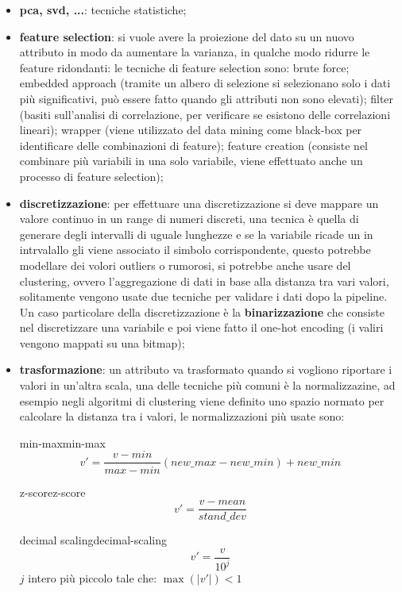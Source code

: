 \documentclass[12pt]{article}
\begin{document}
\begin{itemize}
    \item \textbf{pca, svd, ...}: tecniche statistiche;
    \item \textbf{feature selection}: si vuole avere la proiezione del dato su un nuovo attributo in modo da aumentare la varianza, in qualche modo ridurre le feature ridondanti: le tecniche di feature selection sono: brute force; embedded approach (tramite un albero di selezione si selezionano solo i dati pi\`u significativi, pu\`o essere fatto quando gli attributi non sono elevati); filter (basiti sull'analisi di correlazione, per verificare se esistono delle correlazioni lineari); wrapper (viene utilizzato del data mining come black-box per identificare delle combinazioni di feature); feature creation (consiste nel combinare pi\`u variabili in una solo variabile, viene effettuato anche un processo di feature selection);
    \item \textbf{discretizzazione}: per effettuare una discretizzazione si deve mappare un valore continuo in un range di numeri discreti, una tecnica \`e quella di generare degli intervalli di uguale lunghezze e se la variabile ricade un in intrvalallo gli viene associato il simbolo corrispondente, questo potrebbe modellare dei volori outliers o rumorosi, si potrebbe anche usare del clustering, ovvero l'aggregazione di dati in base alla distanza tra vari valori, solitamente vengono usate due tecniche per validare i dati dopo la pipeline. Un caso particolare della discretizzazione \`e la \textbf{binarizzazione} che consiste nel discretizzare una variabile e poi  viene fatto il one-hot encoding (i valiri vengono mappati su una bitmap);
    \item \textbf{trasformazione}: un attributo va trasformato quando si vogliono riportare i valori in un'altra scala, una delle tecniche pi\`u comuni \`e la normalizzazine, ad esempio negli algoritmi di clustering viene definito uno spazio normato per calcolare la distanza tra i valori, le normalizzazioni pi\`u usate sono:
        \begin{theorem}{min-max}{min-max}
            \[ v' = \frac{v - min}{max - min} (new\_max - new\_min) + new\_min \]
        \end{theorem}
        \begin{theorem}{z-score}{z-score}
            \[ v' = \frac{v - mean}{stand\_dev} \]
        \end{theorem}
        \begin{theorem}{decimal scaling}{decimal-scaling}
            \[ v' = \frac{v}{10^{j}} \]
            $j$ intero più piccolo tale che: $\max (|v'|) < 1$
        \end{theorem}
\end{itemize}
\end{document}
